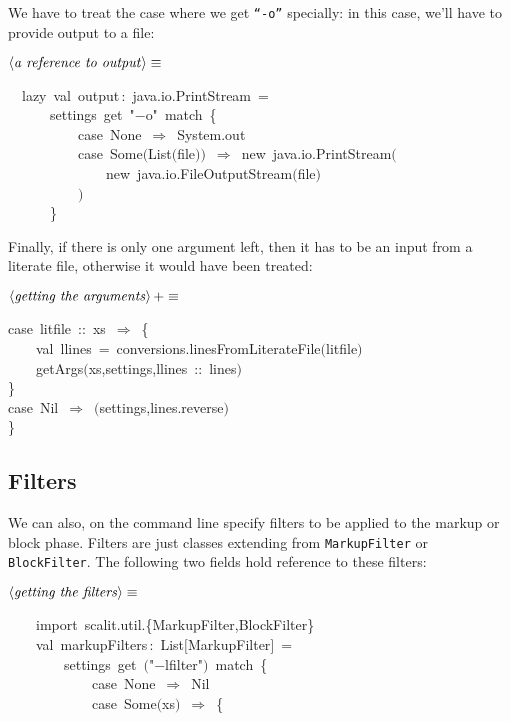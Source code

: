 \documentclass[a4paper,12pt]{article}
\begin{document}
We have to treat the case where we get \texttt{``-o''} specially:
in this case, we'll have to provide output to a file:

$\left<\mbox{\emph{a reference to output}}\right>\equiv$
\begin{program}~~{\vem lazy}~{\vem val}~output\,{\rm :}~java.io.PrintStream~=
\\~~~~~~settings~get~"$-$o"~{\vem match}~{\small\{}
\\~~~~~~~~~~{\vem case}~None~$\Rightarrow$~System.out
\\~~~~~~~~~~{\vem case}~Some$($List$($file$)$$)$~$\Rightarrow$~{\vem new}~java.io.PrintStream$($
\\~~~~~~~~~~~~~~{\vem new}~java.io.FileOutputStream$($file$)$
\\~~~~~~~~~~$)$
\\~~~~~~{\small\}}
\\[0.5em]\end{program}


Finally, if there is only one argument left, then it has to be
an input from a literate file, otherwise it would have been treated:

$\left<\mbox{\emph{getting the arguments}}\right>+\equiv$
\begin{program}{\vem case}~litfile~{\rm :}{\rm :}~xs~$\Rightarrow$~{\small\{}
\\~~~~{\vem val}~llines~=~conversions.linesFromLiterateFile$($litfile$)$
\\~~~~getArgs$($xs,settings,llines~{\rm :}{\rm :}~lines$)$
\\{\small\}}
\\{\vem case}~Nil~$\Rightarrow$~$($settings,lines.reverse$)$
\\{\small\}}
\\[0.5em]\end{program}


\subsection{Filters}
We can also, on the command line specify filters to be applied to the
markup or block phase. Filters are just classes extending from
\texttt{MarkupFilter} or \texttt{BlockFilter}. The following two fields hold
reference to these filters:

$\left<\mbox{\emph{getting the filters}}\right>\equiv$
\begin{program}~~~~{\vem import}~scalit.util.{\small\{}MarkupFilter,BlockFilter{\small\}}
\\~~~~{\vem val}~markupFilters\,{\rm :}~List$[$MarkupFilter$]$~=
\\~~~~~~~~settings~get~$($"$-$lfilter"$)$~{\vem match}~{\small\{}
\\~~~~~~~~~~~~{\vem case}~None~$\Rightarrow$~Nil
\\~~~~~~~~~~~~{\vem case}~Some$($xs$)$~$\Rightarrow$~{\small\{}
\\[0.5em]\end{program}
\end{document}
